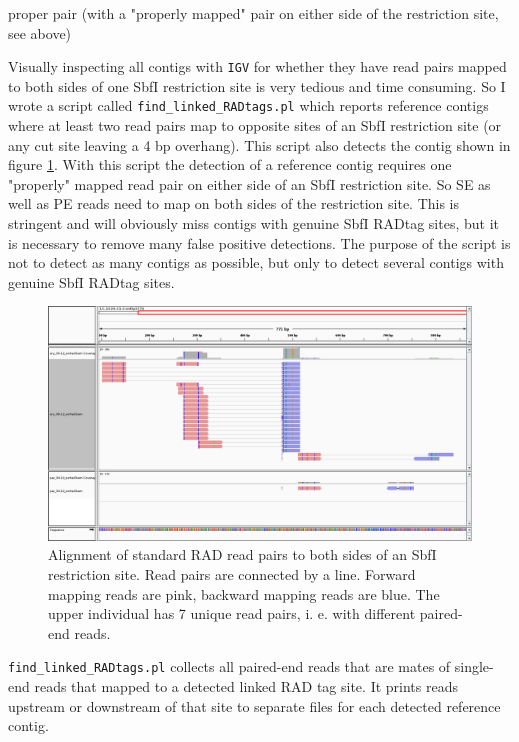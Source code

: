 \documentclass[a4paper,12pt,times,print,index,custombib,custommargin]{PhDThesisPSnPDF}\usepackage[]{graphicx}\usepackage[]{color}
\begin{document}
\gls{proper pair} (with a "properly mapped" pair on either side of the restriction site, see above)

Visually inspecting all contigs with \texttt{IGV} for whether they have read pairs mapped to both sides of one SbfI restriction site is very tedious and time consuming. So I wrote a script called \texttt{find\_linked\_RADtags.pl} which reports reference contigs where at least two read pairs map to opposite sites of an SbfI restriction site (or any cut site leaving a 4 bp overhang). This script also detects the contig shown in figure \ref{LC.1628.C1.Contig1776_standRAD}. With this script the detection of a reference contig requires one "properly" mapped read pair on either side of an SbfI restriction site. So SE as well as PE reads need to map on both sides of the restriction site. This is stringent and will obviously miss contigs with genuine SbfI RADtag sites, but it is necessary to remove many false positive detections. The purpose of the script is not to detect as many contigs as possible, but only to detect several contigs with genuine SbfI RADtag sites.

\begin{figure}
\centering
\includegraphics[width=\textwidth]{igv_LC_1628_C1_Contig1776_standRAD}
\caption{Alignment of standard RAD read pairs to both sides of an SbfI restriction site. Read pairs are connected by a line. Forward mapping reads are pink, backward mapping reads are blue. The upper individual has 7 unique read pairs, i. e. with different paired-end reads.}
\label{LC.1628.C1.Contig1776_standRAD}
\end{figure}

\texttt{find\_linked\_RADtags.pl} collects all paired-end reads that are mates of single-end reads that mapped to a detected \gls{linked RAD tag site}. It prints reads upstream or downstream of that site to separate files for each detected reference contig. 
\end{document}
